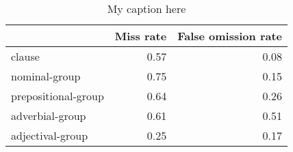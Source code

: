 \begin{table}[!ht]
\centering
\begin{tabular}{lrr}
\toprule
{} &  Miss rate &  False omission rate \\
\midrule
clause              &       0.57 &                 0.08 \\
nominal-group       &       0.75 &                 0.15 \\
prepositional-group &       0.64 &                 0.26 \\
adverbial-group     &       0.61 &                 0.51 \\
adjectival-group    &       0.25 &                 0.17 \\
\bottomrule
\end{tabular}
\caption{My caption here}
\label{tab:unit-types-ocd-combined-errors}
\end{table}